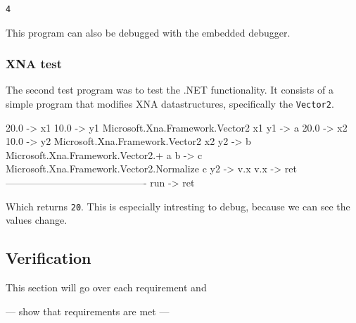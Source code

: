 \begin{lstlisting}
4
\end{lstlisting}

This program can also be debugged with the embedded debugger.

\subsubsection{XNA test}
The second test program was to test the .NET functionality.
It consists of a simple program that modifies XNA datastructures, specifically the \verb|Vector2|.

\begin{MC}
20.0 -> x1
10.0 -> y1
Microsoft.Xna.Framework.Vector2 x1 y1 -> a
20.0 -> x2
10.0 -> y2
Microsoft.Xna.Framework.Vector2 x2 y2 -> b
Microsoft.Xna.Framework.Vector2.+ a b -> c
Microsoft.Xna.Framework.Vector2.Normalize c
y2 -> v.x 
v.x -> ret
-------------------------------------------
run -> ret
\end{MC}

Which returns \verb|20|.
This is especially intresting to debug, because we can see the values change.


\subsection{Verification}
This section will go over each requirement and 

--- show that requirements are met ---

